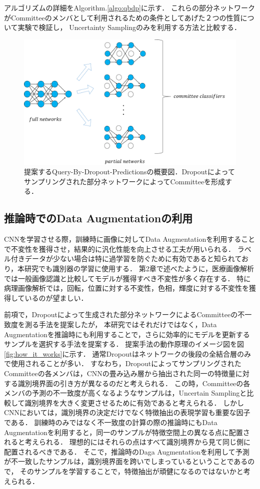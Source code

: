 アルゴリズムの詳細をAlgorithm.\ref{algo:qbdp}に示す．
これらの部分ネットワークがCommitteeのメンバとして利用されるための条件としてあげた２つの性質について実験で検証し，
Uncertainty Samplingのみを利用する方法と比較する．

\begin{figure}[tbp]
     \begin{center}
      \includegraphics[width=120mm]{figures/query_by_dropout.png}
     \end{center}
    \caption{\label{fig:query_by_dropout}提案するQuery-By-Dropout-Predictionsの概要図．Dropoutによってサンプリングされた部分ネットワークによってCommitteeを形成する．}
\end{figure}

\subsection{推論時での\textbf{Data Augmentation}の利用}
CNNを学習させる際，訓練時に画像に対してData Augmentationを利用することで不変性を獲得させ，結果的に汎化性能を向上させる工夫が用いられる．
ラベル付きデータが少ない場合は特に過学習を防ぐために有効であると知られており，本研究でも識別器の学習に使用する．
第2章で述べたように，医療画像解析では一般画像認識と比較してモデルが獲得すべき不変性が多く存在する．
特に病理画像解析では，回転，位置に対する不変性，色相，輝度に対する不変性を獲得しているのが望ましい．

前項で，Dropoutによって生成された部分ネットワークによるCommitteeの不一致度を測る手法を提案したが，
本研究ではそれだけではなく，Data Augmentationを推論時にも利用することで，さらに効率的にモデルを更新するサンプルを選択する手法を提案する．
提案手法の動作原理のイメージ図を図\ref{fig:how_it_works}に示す．
通常Dropoutはネットワークの後段の全結合層のみで使用されることが多い．
すなわち，DropoutによってサンプリングされたCommitteeの各メンバは，CNNの畳み込み層から抽出された同一の特徴量に対する識別境界面の引き方が異なるのだと考えられる．
この時，Committeeの各メンバの予測の不一致度が高くなるようなサンプルは，Uncertain Samplingと比較して識別境界を大きく変更させるために有効であると考えられる．
しかしCNNにおいては，識別境界の決定だけでなく特徴抽出の表現学習も重要な因子である．
訓練時のみではなく不一致度の計算の際の推論時にもData Augmentationを利用すると，同一のサンプルが特徴空間上の異なる点に配置されると考えられる．
理想的にはそれらの点はすべて識別境界から見て同じ側に配置されるべきである．
そこで，推論時のDaga Augmentationを利用して予測が不一致したサンプルは，識別境界面を跨いでしまっているということであるので，
そのサンプルを学習することで，特徴抽出が頑健になるのではないかと考えられる．

